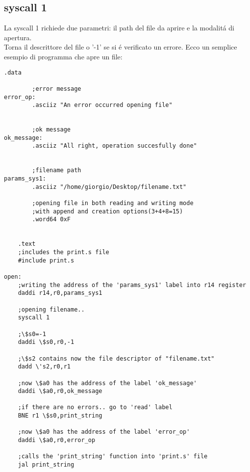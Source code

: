 \documentclass[12pt]{report}
\begin{document}
\subsection{syscall 1}
La syscall 1 richiede due parametri: il path del file da aprire e la modalit\'{a} di apertura.\\
Torna il descrittore del file o '-1' se si \'{e} verificato un errore.
Ecco un semplice esempio di programma che apre un file:
\begin{lstlisting}[caption={syscall1}, label={code:syscall1}, style={mips}]
      	.data

		;error message
error_op:				
		.asciiz "An error occurred opening file"	


		;ok message
ok_message:		
		.asciiz "All right, operation succesfully done"


		;filename path
params_sys1:		
		.asciiz	"/home/giorgio/Desktop/filename.txt"

		;opening file in both reading and writing mode
		;with append and creation options(3+4+8=15)	
		.word64	0xF					


	.text
	;includes the print.s file
	#include print.s			

open:
	;writing the address of the 'params_sys1' label into r14 register
	daddi r14,r0,params_sys1	

	;opening filename..	
	syscall 1
	
	;\$s0=-1			
	daddi \$s0,r0,-1	

	;\$s2 contains now the file descriptor of "filename.txt" 	
	dadd \'s2,r0,r1	

	;now \$a0 has the address of the label 'ok_message'			
	daddi \$a0,r0,ok_message	

	;if there are no errors.. go to 'read' label		
	BNE r1 \$s0,print_string	

	;now \$a0 has the address of the label 'error_op'	
	daddi \$a0,r0,error_op		

	;calls the 'print_string' function into 'print.s' file	
	jal print_string			
\end{lstlisting}
\end{document}
